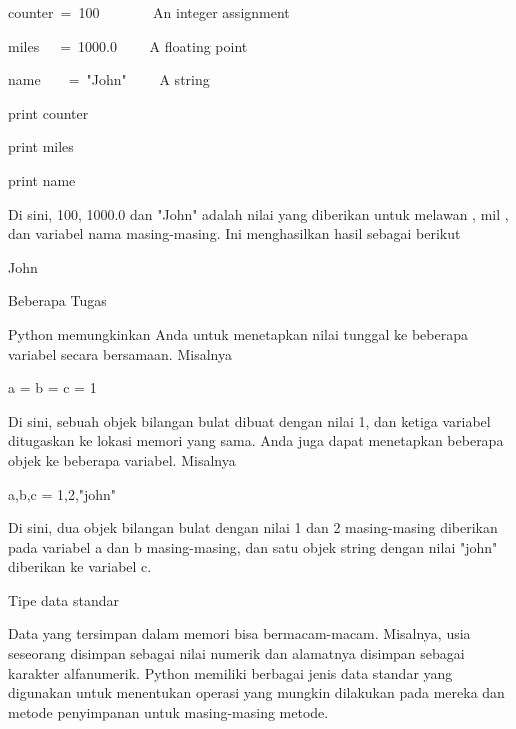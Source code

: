 \vspace{12pt}
\noindent 
counter~=~100~~~~~~~    An integer assignment \par
\noindent 
miles~~~=~1000.0~~~~    A floating point \par
\noindent 
name~~~~=~"John"~~~~    A string \par
\vspace{12pt}
\noindent 
print counter \par
\noindent 
print miles \par
\noindent 
print name \par
\vspace{12pt}
\noindent 
Di sini, 100, 1000.0 dan "John" adalah nilai yang diberikan untuk $  $melawan $  $, $  $mil $  $, dan $  $variabel $  $nama $  $masing-masing. $  $Ini menghasilkan hasil sebagai berikut  \par
\vspace{12pt}
 \par
{} \par
\noindent 
John \par
\vspace{12pt}
\noindent 
Beberapa Tugas \par
\noindent 
Python memungkinkan Anda untuk menetapkan nilai tunggal ke beberapa variabel secara bersamaan. $  $Misalnya  \par
\vspace{12pt}
\noindent 
a = b = c = 1 \par
\vspace{12pt}
\noindent 
Di sini, sebuah objek bilangan bulat dibuat dengan nilai 1, dan ketiga variabel ditugaskan ke lokasi memori yang sama. $  $Anda juga dapat menetapkan beberapa objek ke beberapa variabel. $  $Misalnya  \par
\vspace{12pt}
\noindent 
a,b,c = 1,2,"john" \par
\vspace{12pt}
\noindent 
Di sini, dua objek bilangan bulat dengan nilai 1 dan 2 masing-masing diberikan pada variabel a dan b masing-masing, dan satu objek string dengan nilai "john" diberikan ke variabel c. \par
\vspace{12pt}
\noindent 
Tipe data standar \par
\vspace{12pt}
\noindent 
Data yang tersimpan dalam memori bisa bermacam-macam. $  $Misalnya, usia seseorang disimpan sebagai nilai numerik dan alamatnya disimpan sebagai karakter alfanumerik. $  $Python memiliki berbagai jenis data standar yang digunakan untuk menentukan operasi yang mungkin dilakukan pada mereka dan metode penyimpanan untuk masing-masing metode. \par
